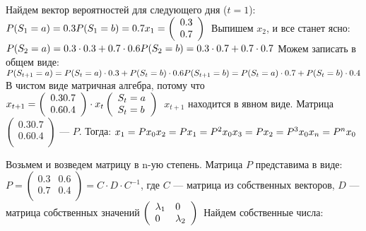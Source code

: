 Найдем вектор вероятностей для следующего дня ($t=1$):
$P(S_1=a)=0.3\\
P(S_1=b)=0.7\\
x_1= \left( \begin{array}{l}
		0.3 \\ 
		0.7\\
		\end{array} \right)\\ $
Выпишем $x_2$, и все станет ясно:
$P(S_2=a)=0.3\cdot 0.3+0.7\cdot0.6\\
P(S_2=b)=0.3\cdot0.7+0.7\cdot0.7\\ $
Можем записать в общем виде:
$P(S_{t+1}=a)=P(S_t=a)\cdot0.3+P(S_t=b)\cdot0.6\\
P(S_{t+1}=b)=P(S_t=a)\cdot0.7+P(S_t=b)\cdot0.4\\ $
В чистом виде матричная алгебра, потому что 
$x_{t+1}= 
\left( \begin{array}{ll}
		0.3  0.7\\
		0.6  0.4\\
\end{array} \right)\cdot
x_t
\left( \begin{array}{l}
		S_t=a\\
		S_t=b\\
\end{array} \right)\\ $
$x_{t+1}$ находится в явном виде.
Матрица $\left( \begin{array}{ll}
		0.3  0.7\\
		0.6  0.4\\
\end{array} \right)$  ---  $P$. Тогда:
$x_1=Px_0\\
x_2=Px_1=P^2 x_0\\
x_3=Px_2=P^3x_0\\
x_n=P^nx_0\\ $

Возьмем и возведем матрицу в n-ую степень.
Матрица $P$ представима в виде:
$P = \left( \begin{array}{ll}
		0.3 & 0.6\\
		0.7 & 0.4\\
		\end{array} \right) =C \cdot D\cdot C^{-1}
$, где $C$ --- матрица из собственных векторов, $D$ --- матрица собственных значений
$\left( \begin{array}{ll}
		\lambda_1  & 0\\
		0  & \lambda_2\\
		\end{array} \right)\\ $
Найдем собственные числа:
			
